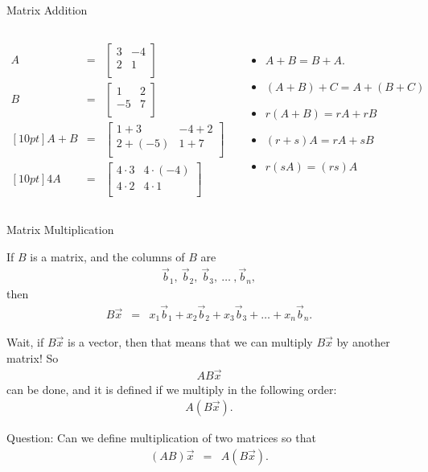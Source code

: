 \documentclass[svgnames,table,,aspectratio=169]{beamer}
\newcommand{\twoByTwo}[4]{
  \left[
    \begin{array}{rr}
      #1 & #2 \\
      #3 & #4 \\
    \end{array}
  \right]
}
\begin{document}
\begin{frame}{Matrix Addition}

  \begin{columns}
    \begin{eqnarray*}
      A & = & \twoByTwo{3}{-4}{2}{1} \\
      B & = & \twoByTwo{1}{2}{-5}{7} \\ [10pt]
      A+B & = & \twoByTwo{1+3}{-4+2}{2+(-5)}{1+7} \\ [10pt]
      4A  & = & \twoByTwo{4\cdot 3}{4\cdot (-4)}{4\cdot 2}{4\cdot 1}
    \end{eqnarray*}

    \begin{itemize}
    \item $A+B=B+A$.
    \item $(A+B)+C=A+(B+C)$
    \item $r(A+B) = rA + rB$
    \item $(r+s)A = rA + sB$
    \item $r(sA)=(rs)A$
    \end{itemize}
  \end{columns}
\end{frame}

\begin{frame}{Matrix Multiplication}

  If $B$ is a matrix, and the columns of $B$ are
  \begin{eqnarray*}
    \vec{b}_1, ~ \vec{b}_2, ~ \vec{b}_3, ~ \ldots ~ , \vec{b}_n,
  \end{eqnarray*}
  then
  \begin{eqnarray*}
    B\vec{x} & = &  x_1 \vec{b}_1 + x_2 \vec{b}_2
                   + x_3 \vec{b}_3 +  \ldots +  x_n \vec{b}_n.
  \end{eqnarray*}

  Wait, if $B\vec{x}$ is a vector, then that means that we can
  multiply $B\vec{x}$ by another matrix! So
  \begin{eqnarray*}
    AB\vec{x}
  \end{eqnarray*}
  can be done, and it is defined if we multiply in the following order:
  \begin{eqnarray*}
    A\left(B\vec{x}\right).
  \end{eqnarray*}

  Question: Can we define multiplication of two matrices so that
  \begin{eqnarray*}
    \left(AB\right)\vec{x} & = & A\left(B\vec{x}\right).
  \end{eqnarray*}

  
\end{frame}
\end{document}
